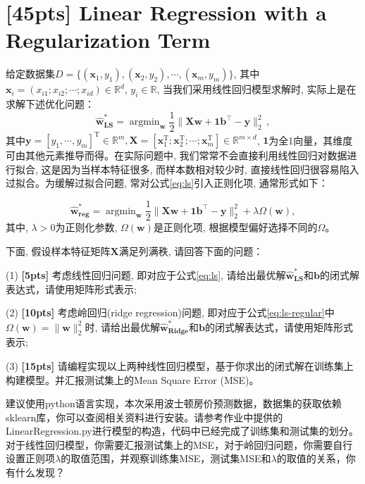 \documentclass[a4paper,UTF8]{article}
\theoremstyle{definition}
\begin{document}
\newpage


\section{[45pts] Linear Regression with a Regularization Term}

给定数据集$D = \{(\mathbf{x}_1,y_1),(\mathbf{x}_2,y_2),\cdots,(\mathbf{x}_m,y_m)\}$, 其中$\mathbf{x}_i = (x_{i1};x_{i2};\cdots;x_{id}) \in \mathbb{R}^d$, $y_i \in \mathbb{R}$, 当我们采用线性回归模型求解时, 实际上是在求解下述优化问题：
\begin{equation}
	\label{eq:ls}
	\hat{\mathbf{w}}_{\textbf{LS}}^* = \mathop{\arg\min}_{\mathbf{w}} \frac{1}{2}\lVert  \mathbf {X}\mathbf{w}+\mathbf{1}\mathbf{b}^\top -\mathbf{y} \rVert_2^2\,,
\end{equation}
其中$\mathbf{y} = [y_1,\cdots,y_m]^\mathrm{T} \in \mathbb{R}^m, \mathbf{X} = [\mathbf{x}_1^\mathrm{T};\mathbf{x}_2^\mathrm{T};\cdots;\mathbf{x}_m^\mathrm{T}]\in \mathbb{R}^{m\times d}$, $\mathbf{1}$为全1向量，其维度可由其他元素推导而得。在实际问题中, 我们常常不会直接利用线性回归对数据进行拟合, 这是因为当样本特征很多, 而样本数相对较少时, 直接线性回归很容易陷入过拟合。为缓解过拟合问题, 常对公式\eqref{eq:ls}引入正则化项, 通常形式如下：

\begin{equation}
	\label{eq:ls-regular}
	\hat{\mathbf{w}}_{\textbf{reg}}^* = \mathop{\arg\min}_{\mathbf{w}} \frac{1}{2}\lVert \mathbf {X}\mathbf{w}+\mathbf{1}\mathbf{b}^\top -\mathbf{y} \rVert_2^2 +\lambda \Omega(\mathbf{w}),
\end{equation}
其中, $\lambda> 0$为正则化参数, $\Omega(\mathbf{w})$是正则化项, 根据模型偏好选择不同的$\Omega$。

下面, 假设样本特征矩阵$\mathbf{X}$满足列满秩, 请回答下面的问题：

(1) \textbf{[5pts]} 考虑线性回归问题, 即对应于公式\eqref{eq:ls}, 请给出最优解$\hat{\mathbf{w}}_{\textbf{LS}}^*$和$\mathbf{b}$的闭式解表达式，请使用矩阵形式表示;

(2) \textbf{[10pts]} 考虑{岭回归(ridge regression)}问题, 即对应于公式\eqref{eq:ls-regular}中$\Omega(\mathbf{w}) = \lVert \mathbf{w}\rVert_2^2$时, 请给出最优解$\hat{\mathbf{w}}_{\textbf{Ridge}}^*$和$\mathbf{b}$的闭式解表达式，请使用矩阵形式表示;

(3) \textbf{[15pts]} 请编程实现以上两种线性回归模型，基于你求出的闭式解在训练集上构建模型。并汇报测试集上的Mean Square Error (MSE)。

建议使用python语言实现，本次采用波士顿房价预测数据，数据集的获取依赖sklearn库，你可以查阅相关资料进行安装。请参考作业中提供的LinearRegression.py进行模型的构造，代码中已经完成了训练集和测试集的划分。
对于线性回归模型，你需要汇报测试集上的MSE，对于岭回归问题，你需要自行设置正则项$\lambda$的取值范围，并观察训练集MSE，测试集MSE和$\lambda$的取值的关系，你有什么发现？
\end{document}
